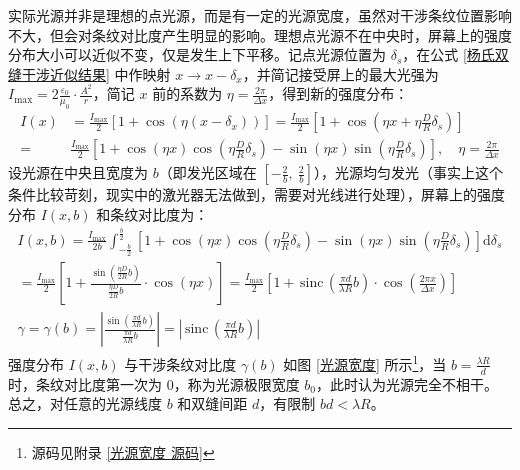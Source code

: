 \documentclass[UTF8]{report}
\def\sinc{\mathrm{\,sinc}\,}
\theoremstyle{MyLineTheoremStyle} %
\theoremstyle{MyBlockTheoremStyle} %
\theoremstyle{MySubsubsectionStyle} %
\begin{document}
实际光源并非是理想的点光源，而是有一定的光源宽度，虽然对干涉条纹位置影响不大，但会对条纹对比度产生明显的影响。理想点光源不在中央时，屏幕上的强度分布大小可以近似不变，仅是发生上下平移。记点光源位置为 $\delta_s$，在公式 \ref{杨氏双缝干涉近似结果} 中作映射 $x \longrightarrow x - \delta_x$，并简记接受屏上的最大光强为 $I_{\text{max}} = 2 \frac{\varepsilon_0}{\mu_0} \cdot \frac{A^2}{r}$，简记 $x$ 前的系数为 $\eta = \frac{2 \pi}{\Delta x}$，得到新的强度分布：
\begin{align}
I(x) &= \frac{I_{\text{max}}}{2}\left[
1 + \cos \left( \eta (x - \delta_x)\right)
\right] = \frac{I_{\text{max}}}{2}\left[
    1 + \cos \left( \eta x + \eta\frac{D}{R}\delta_s\right)
    \right]
\\
= &
\frac{I_{\text{max}}}{2}\left[
1 + \cos \left( \eta x \right)\cos \left(\eta\frac{D}{R}\delta_s \right) - \sin \left( \eta x \right)\sin \left( \eta\frac{D}{R}\delta_s \right)
\right],\quad \eta = \frac{2 \pi}{\Delta x}
\end{align}
设光源在中央且宽度为 $b$（即发光区域在 $[-\frac{2}{b},\ \frac{2}{b}]$），光源均匀发光（事实上这个条件比较苛刻，现实中的激光器无法做到，需要对光线进行处理），屏幕上的强度分布 $I(x, b)$ 和条纹对比度为：
\begin{gather}
I(x, b) = \frac{I_{\text{max}}}{2b} \int_{-\frac{b}{2}}^{\frac{b}{2}} \left[ 1 + \cos \left( \eta x \right)\cos \left( \eta\frac{D}{R}\delta_s \right) - \sin \left( \eta x \right)\sin \left( \eta\frac{D}{R}\delta_s \right) \right] \mathrm{d} \delta_s 
\\ 
= \frac{I_{\text{max}}}{2} \left[ 1 + \frac{\sin \left( \frac{\eta D}{2 R} b \right)}{\frac{\eta D}{2 R} b}\cdot \cos \left( \eta x \right) \right] 
= \frac{I_{\text{max}}}{2} \left[ 1 + \sinc \left(\frac{\pi d}{\lambda R} b\right) \cdot \cos \left( \frac{2 \pi x}{\Delta x}  \right) \right] 
\\ 
\gamma = \gamma(b) 
= \left| \frac{\sin \left( \frac{\pi d}{\lambda R} b \right)}{\frac{\pi d}{\lambda R} b} \right|
= \left| \sinc \left(\frac{\pi d}{\lambda R} b\right) \right|
\end{gather}
强度分布 $I(x, b)$ 与干涉条纹对比度 $\gamma(b)$ 如图 \ref{光源宽度} 所示\footnote{源码见附录 \ref{光源宽度 源码}}，当 $b = \frac{\lambda R}{d}$ 时，条纹对比度第一次为 0，称为光源极限宽度 $b_0$，此时认为光源完全不相干。总之，对任意的光源线度 $b$ 和双缝间距 $d$，有限制 $bd <  \lambda R$。
\end{document}
